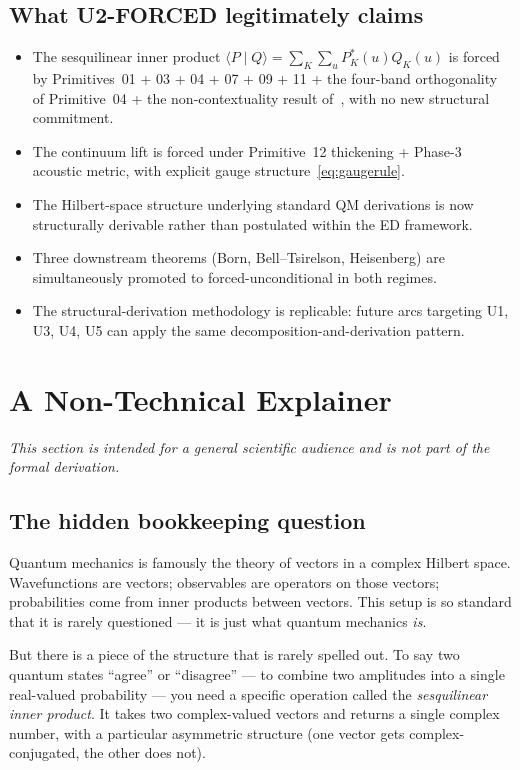 \documentclass[11pt,a4paper]{article}
\begin{document}
\subsection{What U2-FORCED legitimately claims}

\begin{itemize}
  \item The sesquilinear inner product $\langle P \mid Q \rangle = \sum_K \sum_u P_K^*(u) Q_K(u)$ is forced by Primitives~01 + 03 + 04 + 07 + 09 + 11 + the four-band orthogonality of Primitive~04 + the non-contextuality result of~\cite{borngleason}, with no new structural commitment.
  \item The continuum lift is forced under Primitive~12 thickening + Phase-3 acoustic metric, with explicit gauge structure~\eqref{eq:gaugerule}.
  \item The Hilbert-space structure underlying standard QM derivations is now structurally derivable rather than postulated within the ED framework.
  \item Three downstream theorems (Born, Bell--Tsirelson, Heisenberg) are simultaneously promoted to forced-unconditional in both regimes.
  \item The structural-derivation methodology is replicable: future arcs targeting U1, U3, U4, U5 can apply the same decomposition-and-derivation pattern.
\end{itemize}

\section{A Non-Technical Explainer}\label{sec:explainer}

\emph{This section is intended for a general scientific audience and is not part of the formal derivation.}

\subsection{The hidden bookkeeping question}

Quantum mechanics is famously the theory of vectors in a complex Hilbert space. Wavefunctions are vectors; observables are operators on those vectors; probabilities come from inner products between vectors. This setup is so standard that it is rarely questioned --- it is just what quantum mechanics \emph{is}.

But there is a piece of the structure that is rarely spelled out. To say two quantum states ``agree'' or ``disagree'' --- to combine two amplitudes into a single real-valued probability --- you need a specific operation called the \emph{sesquilinear inner product}. It takes two complex-valued vectors and returns a single complex number, with a particular asymmetric structure (one vector gets complex-conjugated, the other does not).
\end{document}

